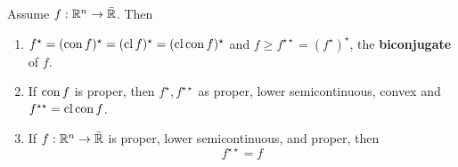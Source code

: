 \begin{thm}
  \label{defn:conjugate_functions:6}
  Assume $f: \mathbb{R}^{n} \rightarrow \bar {\mathbb{R}}$.  Then
  \begin{enumerate}
  \item $f^{\star} = (\operatorname*{con} f)^{\star} = (\operatorname*{cl} f)^{\star} = (\operatorname*{cl} \operatorname*{con}
    f)^{\star}$ and $f \geq f^{\star \star} = (f^{\star})^{\star}$,
    the \textbf{biconjugate} of $f$.
  \item If $\operatorname*{con} f$ is proper, then $f^{\star}, f^{\star \star}$ as
    proper, lower semicontinuous, convex and $f^{\star \star}= \operatorname*{cl}
    \operatorname*{con} f$.
  \item If $f: \mathbb{R}^{n} \rightarrow \bar {\mathbb{R}}$ is proper, lower
    semicontinuous, and proper, then
    \begin{equation}
      \label{eq:54}
      f^{\star \star} = f
    \end{equation}
  \end{enumerate}
\end{thm}

